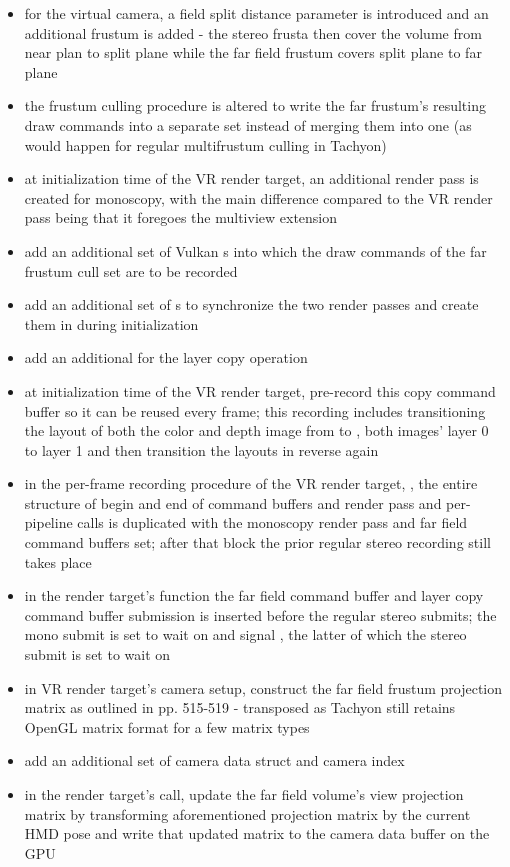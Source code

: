 \begin{itemize}
\item for the virtual camera, a field split distance parameter is introduced and an additional frustum is added - the stereo frusta then cover the volume from near plan to split plane while the far field frustum covers split plane to far plane
\item the frustum culling procedure is altered to write the far frustum's resulting draw commands into a separate set instead of merging them into one (as would happen for regular multifrustum culling in Tachyon)
\item at initialization time of the VR render target, an additional render pass is created for monoscopy, with the main difference compared to the VR render pass being that it foregoes the multiview extension
\item add an additional set of Vulkan s into which the draw commands of the far frustum cull set are to be recorded
\item add an additional set of s to synchronize the two render passes and create them in  during initialization
\item add an additional  for the layer copy operation
\item at initialization time of the VR render target, pre-record this copy command buffer so it can be reused every frame; this recording includes transitioning the layout of both the color and depth image from  to ,  both images' layer 0 to layer 1 and then transition the layouts in reverse again
\item in the per-frame recording procedure of the VR render target, , the entire structure of begin and end of command buffers and render pass and per-pipeline  calls is duplicated with the monoscopy render pass and far field command buffers set; after that block the prior regular stereo recording still takes place
\item in the render target's  function the far field command buffer and layer copy command buffer submission is inserted before the regular stereo submits; the mono submit is set to wait on  and signal , the latter of which the stereo submit is set to wait on
\item in VR render target's camera setup, construct the far field frustum projection matrix as outlined in \cite{Lapinski.2017} pp. 515-519 - transposed as Tachyon still retains OpenGL matrix format for a few matrix types
\item add an additional set of camera data struct and camera index
\item in the render target's  call, update the far field volume's view projection matrix by transforming aforementioned projection matrix by the current HMD pose and write that updated matrix to the camera data buffer on the GPU
\end{itemize}

